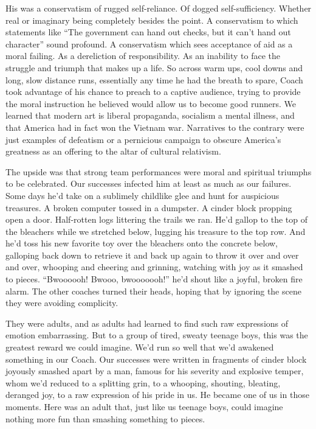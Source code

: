 \documentclass[12pt, oneside]{memoir}
\begin{document}
His was a conservatism of rugged self-reliance.
Of dogged self-sufficiency.
Whether real or imaginary being completely besides the point.
A conservatism to which statements like ``The government can hand out
checks, but it can't hand out character'' sound profound.
A conservatism which sees acceptance of aid as a moral failing.
As a dereliction of responsibility.
As an inability to face the struggle and triumph that makes up a life.
So across warm ups, cool downs and long, slow distance runs, essentially
any time he had the breath to spare, Coach took advantage of his
chance to preach to a captive audience, trying to provide the moral
instruction he believed would allow us to become good runners.
We learned that modern art is liberal propaganda, socialism a mental
illness, and that America had in fact won the Vietnam war.
Narratives to the contrary were just examples of defeatism or a
pernicious campaign to obscure America's greatness as an offering to
the altar of cultural relativism.

The upside was that strong team performances were moral and spiritual
triumphs to be celebrated.
Our successes infected him at least as much as our failures.
Some days he'd take on a sublimely childlike glee and hunt for
auspicious treasures.
A broken computer tossed in a dumpster.
A cinder block propping open a door.
Half-rotten logs littering the trails we ran.
He'd gallop to the top of the bleachers while we stretched below,
lugging his treasure to the top row.
And he'd toss his new favorite toy over the bleachers onto the
concrete below, galloping back down to retrieve it and back up again
to throw it over and over and over, whooping and cheering and
grinning, watching with joy as it smashed to pieces.
``Bwoooooh! Bwooo, bwooooooh!'' he'd shout like a joyful, broken fire
alarm.
The other coaches turned their heads, hoping that by ignoring the
scene they were avoiding complicity.

They were adults, and as adults had learned to find such raw
expressions of emotion embarrassing.
But to a group of tired, sweaty teenage boys, this was the greatest
reward we could imagine.
We'd run so well that we'd awakened something in our Coach.
Our successes were written in fragments of cinder block joyously
smashed apart by a man, famous for his severity and explosive temper,
whom we'd reduced to a splitting grin, to a whooping, shouting, bleating,
deranged joy, to a raw expression of his pride in us.
He became one of us in those moments.
Here was an adult that, just like us teenage boys, could imagine
nothing more fun than smashing something to pieces.
\end{document}
